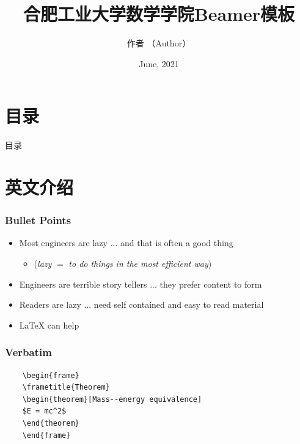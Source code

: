 \documentclass[aspectratio=169]{beamer}
\title{合肥工业大学数学学院Beamer模板}
\author[LaureatePoet]{作者  （Author）}
\institute{School of Mathematics, HFUT}
\date{June, 2021}
\begin{document}
  
  \begin{frame}
    \maketitle
  \end{frame}

\section*{目录}
\begin{frame}{目录}
	\tableofcontents
\end{frame}


\section{英文介绍}
\begin{frame}
\frametitle{Bullet Points}
\vspace{-0.3cm}
\begin{itemize}[<+->]
	\item Most engineers are lazy ... and that is often a good thing
	\begin{itemize}
		\item (\textit{lazy} $=$ \textit{to do things in the most efficient way})
	\end{itemize}
	\item Engineers are terrible story tellers ... they prefer content to form
	\item Readers are lazy ... need self contained and easy to read material
	\item \LaTeX{} can help
\end{itemize}
\end{frame}

\begin{frame}[fragile] %
\frametitle{Verbatim}
\begin{example}
	\begin{verbatim}
	\begin{frame}
	\frametitle{Theorem}
	\begin{theorem}[Mass--energy equivalence]
	$E = mc^2$
	\end{theorem}
	\end{frame}\end{verbatim}
\end{example}
\end{frame}
\end{document}
